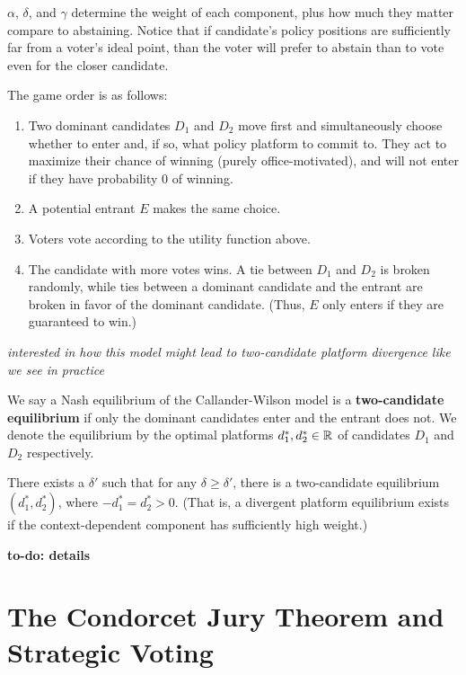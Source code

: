 \documentclass[../../../main.tex]{subfiles}
\begin{document}
\begin{definition}
    $\alpha$, $\delta$, and $\gamma$ determine the weight of each component, plus how much they matter compare to abstaining. 
    Notice that if candidate's policy positions are sufficiently far from a voter's ideal point, than the voter will prefer to abstain than to vote even for the closer candidate.

    The game order is as follows:
    \begin{enumerate}
        \item Two dominant candidates $D_1$ and $D_2$ move first and simultaneously choose whether to enter and, if so, what policy platform to commit to. They act to maximize their chance of winning (purely office-motivated), and will not enter if they have probability 0 of winning.
        \item A potential entrant $E$ makes the same choice.
        \item Voters vote according to the utility function above. 
        \item The candidate with more votes wins. A tie between $D_1$ and $D_2$ is broken randomly, while ties between a dominant candidate and the entrant are broken in favor of the dominant candidate. (Thus, $E$ only enters if they are guaranteed to win.)
    \end{enumerate}
\end{definition}

\textit{interested in how this model might lead to two-candidate platform divergence like we see in practice}

\begin{definition}
    We say a Nash equilibrium of the Callander-Wilson model is a \textbf{two-candidate equilibrium} if only the dominant candidates enter and the entrant does not.
    We denote the equilibrium by the optimal platforms $d_1^*,d_2^*\in \mathbb{R}$ of candidates $D_1$ and $D_2$ respectively.
\end{definition}

\begin{theorem}
    There exists a $\delta'$ such that for any $\delta\geq \delta'$, there is a two-candidate equilibrium $(d_1^*,d_2^*)$, where $-d_1^*=d_2^*>0$. 
    (That is, a divergent platform equilibrium exists if the context-dependent component has sufficiently high weight.)
\end{theorem}

\textbf{to-do: details}

\section{The Condorcet Jury Theorem and Strategic Voting}
\end{document}
